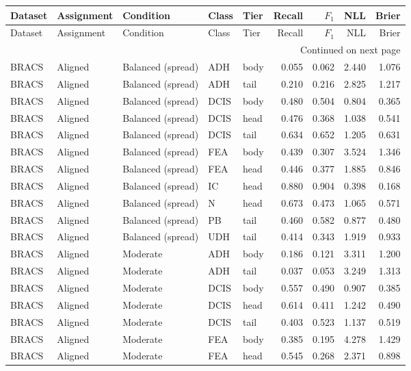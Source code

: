 \begin{longtable}{lllllrrrr}
\toprule
Dataset & Assignment & Condition & Class & Tier & Recall & $F_1$ & NLL & Brier \\
\midrule
\endfirsthead
\toprule
Dataset & Assignment & Condition & Class & Tier & Recall & $F_1$ & NLL & Brier \\
\midrule
\endhead
\midrule
\multicolumn{9}{r}{Continued on next page} \\
\midrule
\endfoot
\bottomrule
\endlastfoot
BRACS & Aligned & Balanced (spread) & ADH & body & 0.055 & 0.062 & 2.440 & 1.076 \\
BRACS & Aligned & Balanced (spread) & ADH & tail & 0.210 & 0.216 & 2.825 & 1.217 \\
BRACS & Aligned & Balanced (spread) & DCIS & body & 0.480 & 0.504 & 0.804 & 0.365 \\
BRACS & Aligned & Balanced (spread) & DCIS & head & 0.476 & 0.368 & 1.038 & 0.541 \\
BRACS & Aligned & Balanced (spread) & DCIS & tail & 0.634 & 0.652 & 1.205 & 0.631 \\
BRACS & Aligned & Balanced (spread) & FEA & body & 0.439 & 0.307 & 3.524 & 1.346 \\
BRACS & Aligned & Balanced (spread) & FEA & head & 0.446 & 0.377 & 1.885 & 0.846 \\
BRACS & Aligned & Balanced (spread) & IC & head & 0.880 & 0.904 & 0.398 & 0.168 \\
BRACS & Aligned & Balanced (spread) & N & head & 0.673 & 0.473 & 1.065 & 0.571 \\
BRACS & Aligned & Balanced (spread) & PB & tail & 0.460 & 0.582 & 0.877 & 0.480 \\
BRACS & Aligned & Balanced (spread) & UDH & tail & 0.414 & 0.343 & 1.919 & 0.933 \\
BRACS & Aligned & Moderate & ADH & body & 0.186 & 0.121 & 3.311 & 1.200 \\
BRACS & Aligned & Moderate & ADH & tail & 0.037 & 0.053 & 3.249 & 1.313 \\
BRACS & Aligned & Moderate & DCIS & body & 0.557 & 0.490 & 0.907 & 0.385 \\
BRACS & Aligned & Moderate & DCIS & head & 0.614 & 0.411 & 1.242 & 0.490 \\
BRACS & Aligned & Moderate & DCIS & tail & 0.403 & 0.523 & 1.137 & 0.519 \\
BRACS & Aligned & Moderate & FEA & body & 0.385 & 0.195 & 4.278 & 1.429 \\
BRACS & Aligned & Moderate & FEA & head & 0.545 & 0.268 & 2.371 & 0.898 \\

\end{longtable}
